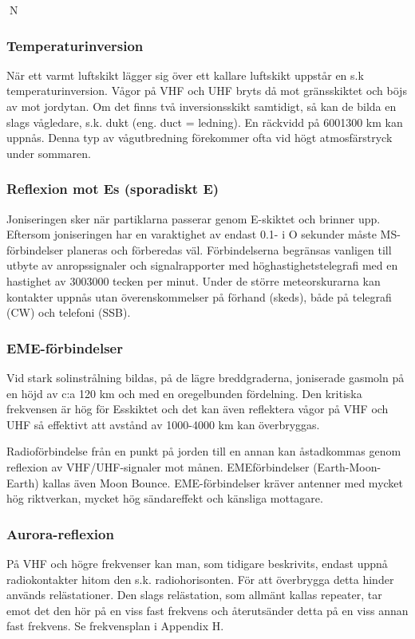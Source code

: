 N
\subsubsection{Temperaturinversion}

När ett varmt luftskikt lägger sig över ett
kallare luftskikt uppstår en s.k temperaturinversion.
Vågor på VHF och UHF bryts då mot
gränsskiktet och böjs av mot jordytan. Om
det finns två inversionsskikt samtidigt, så
kan de bilda en slags vågledare, s.k. dukt
(eng. duct = ledning). En räckvidd på 6001300 km kan uppnås. Denna typ av vågutbredning förekommer ofta vid högt atmosfärstryck under sommaren.

\subsubsection{Reflexion mot Es (sporadiskt E)}

Joniseringen sker när partiklarna passerar genom E-skiktet och brinner upp. Eftersom joniseringen har en varaktighet av endast 0.1- i O sekunder måste MS-förbindelser planeras och förberedas väl. Förbindelserna begränsas vanligen till utbyte av
anropssignaler och signalrapporter med höghastighetstelegrafi med en hastighet av 3003000 tecken per minut. Under de större meteorskurarna kan kontakter uppnås utan överenskommelser på förhand (skeds), både på
telegrafi (CW) och telefoni (SSB).

\subsubsection{EME-förbindelser}

Vid stark solinstrålning bildas, på de lägre
breddgraderna, joniserade gasmoln på en
höjd av c:a 120 km och med en oregelbunden fördelning.
Den kritiska frekvensen är hög för Esskiktet och det kan även reflektera vågor på
VHF och UHF så effektivt att avstånd av
1000-4000 km kan överbryggas.

Radioförbindelse från en punkt på jorden till
en annan kan åstadkommas genom reflexion av VHF/UHF-signaler mot månen. EMEförbindelser (Earth-Moon-Earth) kallas även
Moon Bounce. EME-förbindelser kräver antenner med mycket hög riktverkan, mycket
hög sändareffekt och känsliga mottagare.

\subsubsection{Aurora-reflexion}

På VHF och högre frekvenser kan man, som
tidigare beskrivits, endast uppnå radiokontakter hitom den s.k. radiohorisonten.
För att överbrygga detta hinder används
relästationer. Den slags relästation, som allmänt kallas repeater, tar emot det den hör på
en viss fast frekvens och återutsänder detta
på en viss annan fast frekvens. Se frekvensplan i Appendix H.

